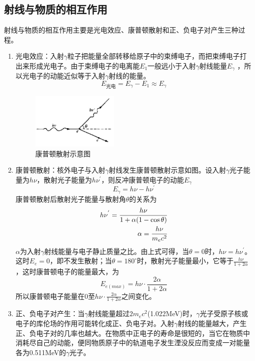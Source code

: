 \documentclass[a4paper]{article}
\begin{document}
\subsection{射线与物质的相互作用}
射线与物质的相互作用主要是光电效应、康普顿散射和正、负电子对产生三种过程。
\begin{enumerate}
	\item 光电效应：入射$\gamma$粒子把能量全部转移给原子中的束缚电子，而把束缚电子打出来形成光电子。由于束缚电子的电离能$E_1$一般远小于入射$\gamma$射线能量$E_{\gamma}$ ，所以光电子的动能近似等于入射$\gamma$射线的能量。
	      \begin{equation*}
		      E_{\text{光电}} = E_{\gamma} - E_1 \approx E_{\gamma}
	      \end{equation*}
	      \begin{figure}[!h]
		      \centering
		      \includegraphics[width=0.4\textwidth]{fig/fig1.pdf}
		      \caption{康普顿散射示意图}\label{fig1}
	      \end{figure}

	\item 康普顿散射：核外电子与入射$\gamma$射线发生康普顿散射示意如图。设入射$\gamma$光子能量为$h\nu$，散射光子能量为$h\nu^{'}$，则反冲康普顿电子的动能$E_{\gamma}$
	      \begin{equation*}
		      E_{\gamma} = h\nu - h\nu^{'}
	      \end{equation*}
	      康普顿散射后散射光子能量与散射角$\theta$的关系为
	      \begin{eqnarray}
		      h\nu^{'} = \frac{h\nu}{1+\alpha(1-\cos\theta)}\label{eq1}\\
		      \alpha = \frac{h\nu}{m_ec^2}\notag
	      \end{eqnarray}
	      $\alpha$为入射$\gamma$射线能量与电子静止质量之比。由上式可得，当$\theta=0$时，$h\nu =h\nu^{'}$。这时$E_e=0$，即不发生散射；当$\theta=180^{\circ}$时，散射光子能量最小，它等于$\frac{h\nu}{1+2\alpha}$，这时康普顿电子的能量最大，为
	      \begin{equation}
		      E_{e(max)} = h\nu\cdot\frac{2\alpha}{1+2\alpha}\label{eq2}
	      \end{equation}
	      所以康普顿电子能量在0至$h\nu\cdot\frac{2\alpha}{1+2\alpha}$之间变化。
	\item 正、负电子对产生：当$\gamma$射线能量超过$2m_ec^2$(1.022MeV)时，$\gamma$光子受原子核或电子的库伦场的作用可能转化成正、负电子对。入射$\gamma$射线的能量越大，产生正、负电子对的几率也越大。在物质中正电子的寿命是很短的，当它在物质中消耗尽自己的动能，便同物质原子中的轨道电子发生湮没反应而变成一对能量各为0.511MeV的$\gamma$光子。
\end{enumerate}
\end{document}
